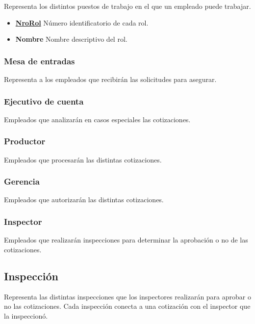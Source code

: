 \documentclass[a4paper,11pt]{article}
\begin{document}
Representa los distintos puestos de trabajo en el que un empleado puede trabajar.

\begin{itemize}
   
  \item \textbf{\uline{NroRol}} Número identificatorio de cada rol.
  
  \item \textbf{Nombre} Nombre descriptivo del rol.
  
\end{itemize}

\subsubsection{Mesa de entradas}

Representa a los empleados que recibirán las solicitudes para asegurar.

\subsubsection{Ejecutivo de cuenta}

Empleados que analizarán en casos especiales las cotizaciones.

\subsubsection{Productor}

Empleados que procesarán las distintas cotizaciones.

\subsubsection{Gerencia}

Empleados que autorizarán las distintas cotizaciones.

\subsubsection{Inspector}

Empleados que realizarán inspecciones para determinar 
la aprobación o no de las cotizaciones.

\subsection{Inspección}

Representa las distintas inspecciones que los inspectores realizarán para aprobar o no las cotizaciones.
Cada inspección conecta a una cotización con el inspector que la inspeccionó.
\end{document}
